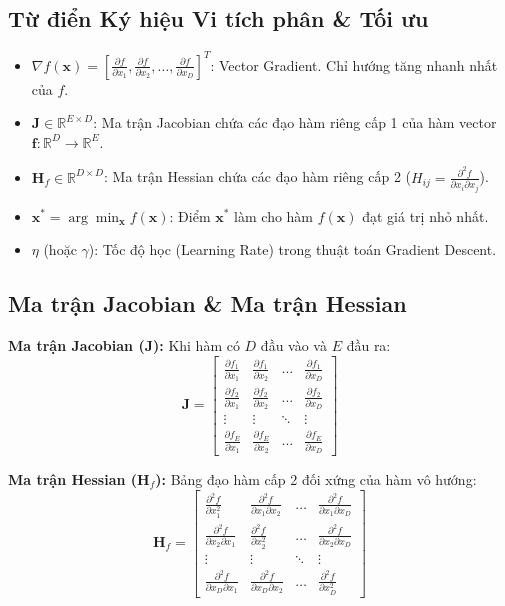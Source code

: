 \documentclass[11pt,a4paper]{article}
\begin{document}
\subsection{Từ điển Ký hiệu Vi tích phân \& Tối ưu}
\begin{symbolbox}
\begin{itemize}
    \item $\nabla f(\mathbf{x}) = \left[ \frac{\partial f}{\partial x_1}, \frac{\partial f}{\partial x_2}, \dots, \frac{\partial f}{\partial x_D} \right]^T$: Vector Gradient. Chỉ hướng tăng nhanh nhất của $f$.
    \item $\mathbf{J} \in \mathbb{R}^{E \times D}$: Ma trận Jacobian chứa các đạo hàm riêng cấp 1 của hàm vector $\mathbf{f}: \mathbb{R}^D \rightarrow \mathbb{R}^E$.
    \item $\mathbf{H}_f \in \mathbb{R}^{D \times D}$: Ma trận Hessian chứa các đạo hàm riêng cấp 2 ($H_{ij} = \frac{\partial^2 f}{\partial x_i \partial x_j}$).
    \item $\mathbf{x}^* = \arg\min_{\mathbf{x}} f(\mathbf{x})$: Điểm $\mathbf{x}^*$ làm cho hàm $f(\mathbf{x})$ đạt giá trị nhỏ nhất.
    \item $\eta$ (hoặc $\gamma$): Tốc độ học (Learning Rate) trong thuật toán Gradient Descent.
\end{itemize}
\end{symbolbox}

\subsection{Ma trận Jacobian \& Ma trận Hessian}
\textbf{Ma trận Jacobian ($\mathbf{J}$):} Khi hàm có $D$ đầu vào và $E$ đầu ra:
$$\mathbf{J} = \begin{bmatrix} 
\frac{\partial f_1}{\partial x_1} & \frac{\partial f_1}{\partial x_2} & \dots & \frac{\partial f_1}{\partial x_D} \\
\frac{\partial f_2}{\partial x_1} & \frac{\partial f_2}{\partial x_2} & \dots & \frac{\partial f_2}{\partial x_D} \\
\vdots & \vdots & \ddots & \vdots \\
\frac{\partial f_E}{\partial x_1} & \frac{\partial f_E}{\partial x_2} & \dots & \frac{\partial f_E}{\partial x_D}
\end{bmatrix}$$

\textbf{Ma trận Hessian ($\mathbf{H}_f$):} Bảng đạo hàm cấp 2 đối xứng của hàm vô hướng:
$$\mathbf{H}_f = \begin{bmatrix}
\frac{\partial^2 f}{\partial x_1^2} & \frac{\partial^2 f}{\partial x_1 \partial x_2} & \dots & \frac{\partial^2 f}{\partial x_1 \partial x_D} \\
\frac{\partial^2 f}{\partial x_2 \partial x_1} & \frac{\partial^2 f}{\partial x_2^2} & \dots & \frac{\partial^2 f}{\partial x_2 \partial x_D} \\
\vdots & \vdots & \ddots & \vdots \\
\frac{\partial^2 f}{\partial x_D \partial x_1} & \frac{\partial^2 f}{\partial x_D \partial x_2} & \dots & \frac{\partial^2 f}{\partial x_D^2}
\end{bmatrix}$$
\end{document}
